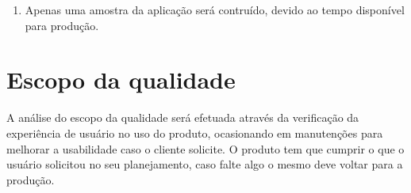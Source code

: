 \begin{appendices}
\begin{enumerate}
	\item Apenas uma amostra da aplicação será contruído, devido ao tempo disponível para produção.
	\end{enumerate}


\section{Escopo da qualidade}
A análise do escopo da qualidade será efetuada através da verificação da experiência de usuário no uso do produto, ocasionando em manutenções para melhorar a usabilidade caso o cliente solicite.
O produto tem que cumprir o que o usuário solicitou no seu planejamento, caso falte algo o mesmo deve voltar para a produção.


\end{appendices}